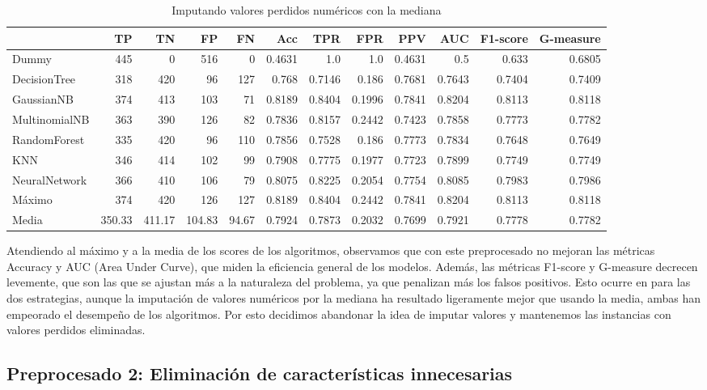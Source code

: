\documentclass{article}
\begin{document}
\begin{table}[H]
\centering
\caption{Imputando valores perdidos numéricos con la mediana}
\label{tab:impute-median}
\begin{tabular}{|lrrrrrrrrrrr|}
\hline
 & TP & TN & FP & FN & Acc & TPR & FPR & PPV & AUC & F1-score & G-measure\\ \hline
Dummy & 445 & 0 & 516 & 0 & 0.4631 & 1.0 & 1.0 & 0.4631 & 0.5 & 0.633 & 0.6805\\
DecisionTree & 318 & 420 & 96 & 127 & 0.768 & 0.7146 & 0.186 & 0.7681 & 0.7643 & 0.7404 & 0.7409\\
GaussianNB & 374 & 413 & 103 & 71 & 0.8189 & 0.8404 & 0.1996 & 0.7841 & 0.8204 & 0.8113 & 0.8118\\
MultinomialNB & 363 & 390 & 126 & 82 & 0.7836 & 0.8157 & 0.2442 & 0.7423 & 0.7858 & 0.7773 & 0.7782\\
RandomForest & 335 & 420 & 96 & 110 & 0.7856 & 0.7528 & 0.186 & 0.7773 & 0.7834 & 0.7648 & 0.7649\\
KNN & 346 & 414 & 102 & 99 & 0.7908 & 0.7775 & 0.1977 & 0.7723 & 0.7899 & 0.7749 & 0.7749\\
NeuralNetwork & 366 & 410 & 106 & 79 & 0.8075 & 0.8225 & 0.2054 & 0.7754 & 0.8085 & 0.7983 & 0.7986\\ \hline
Máximo & 374 & 420 & 126 & 127 & 0.8189 & 0.8404 & 0.2442 & 0.7841 & 0.8204 & 0.8113 & 0.8118\\
Media & 350.33 & 411.17 & 104.83 & 94.67 & 0.7924 & 0.7873 & 0.2032 & 0.7699 & 0.7921 & 0.7778 & 0.7782\\
\hline
\end{tabular}
\end{table}

Atendiendo al máximo y a la media de los scores de los algoritmos,
observamos que con este preprocesado no mejoran las métricas Accuracy
y AUC (Area Under Curve), que miden la eficiencia general de los
modelos. Además, las métricas F1-score y G-measure decrecen levemente,
que son las que se ajustan más a la naturaleza del problema, ya que
penalizan más los falsos positivos. Esto ocurre en para las dos
estrategias, aunque la imputación de valores numéricos por la mediana
ha resultado ligeramente mejor que usando la media, ambas han
empeorado el desempeño de los algoritmos. Por esto decidimos abandonar
la idea de imputar valores y mantenemos las instancias con valores
perdidos eliminadas.

\subsection{Preprocesado 2: Eliminación de características innecesarias}
\end{document}
